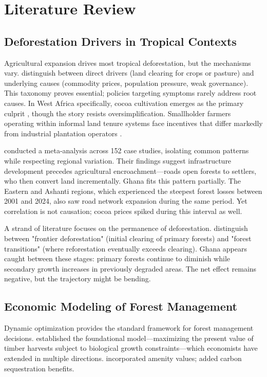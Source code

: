 \section{Literature Review}

\subsection{Deforestation Drivers in Tropical Contexts}

Agricultural expansion drives most tropical deforestation, but the mechanisms vary. \citet{hosonuma2012assessment} distinguish between direct drivers (land clearing for crops or pasture) and underlying causes (commodity prices, population pressure, weak governance). This taxonomy proves essential; policies targeting symptoms rarely address root causes. In West Africa specifically, cocoa cultivation emerges as the primary culprit \citep{kongsager2021drivers}, though the story resists oversimplification. Smallholder farmers operating within informal land tenure systems face incentives that differ markedly from industrial plantation operators \citep{curtis2018classifying}.

\citet{geist2002proximate} conducted a meta-analysis across 152 case studies, isolating common patterns while respecting regional variation. Their findings suggest infrastructure development precedes agricultural encroachment—roads open forests to settlers, who then convert land incrementally. Ghana fits this pattern partially. The Eastern and Ashanti regions, which experienced the steepest forest losses between 2001 and 2024, also saw road network expansion during the same period. Yet correlation is not causation; cocoa prices spiked during this interval as well.

A strand of literature focuses on the permanence of deforestation. \citet{rudel2005tropical} distinguish between "frontier deforestation" (initial clearing of primary forests) and "forest transitions" (where reforestation eventually exceeds clearing). Ghana appears caught between these stages: primary forests continue to diminish while secondary growth increases in previously degraded areas. The net effect remains negative, but the trajectory might be bending.

\subsection{Economic Modeling of Forest Management}

Dynamic optimization provides the standard framework for forest management decisions. \citet{faustmann1849berechnung} established the foundational model—maximizing the present value of timber harvests subject to biological growth constraints—which economists have extended in multiple directions. \citet{hartman1976harvesting} incorporated amenity values; \citet{van1999optimal} added carbon sequestration benefits.

